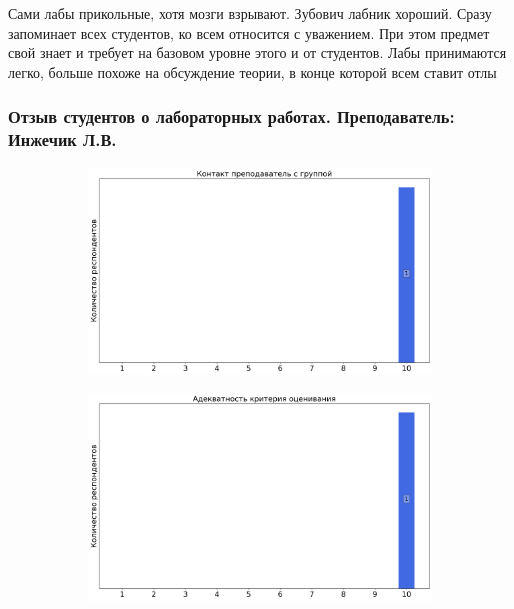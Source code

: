                 \begin{commentbox} 
                    Сами лабы прикольные, хотя мозги взрывают. Зубович лабник хороший. Сразу запоминает всех студентов, ко всем относится с уважением. При этом предмет свой знает и требует на базовом уровне этого и от студентов. Лабы принимаются легко, больше похоже на обсуждение теории, в конце которой всем ставит отлы 
                \end{commentbox}


        \subsubsection{Отзыв студентов о лабораторных работах. Преподаватель: Инжечик Л.В.}
            \begin{figure}[H]
                \centering
                \begin{subfigure}[b]{0.45\textwidth}
                    \centering
                    \includegraphics[width=\textwidth]{images/3 course/Общая физика - квантовая физика/labniks-marks-Инжечик Л.В.-0.png}
                \end{subfigure}
                \begin{subfigure}[b]{0.45\textwidth}
                    \centering
                    \includegraphics[width=\textwidth]{images/3 course/Общая физика - квантовая физика/labniks-marks-Инжечик Л.В.-1.png}

\end{subfigure}
\end{figure}

